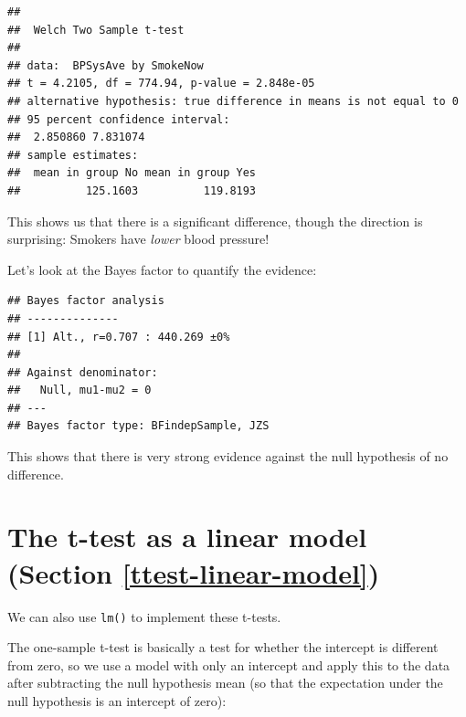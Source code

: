 \documentclass[12pt,]{book}
\newenvironment{Shaded}{\begin{snugshade}}{\end{snugshade}}
\newcommand{\DataTypeTok}[1]{\textcolor[rgb]{0.13,0.29,0.53}{#1}}
\newcommand{\KeywordTok}[1]{\textcolor[rgb]{0.13,0.29,0.53}{\textbf{#1}}}
\newcommand{\NormalTok}[1]{#1}
\newcommand{\OperatorTok}[1]{\textcolor[rgb]{0.81,0.36,0.00}{\textbf{#1}}}
\newcommand{\StringTok}[1]{\textcolor[rgb]{0.31,0.60,0.02}{#1}}
\begin{document}
\begin{verbatim}
## 
##  Welch Two Sample t-test
## 
## data:  BPSysAve by SmokeNow
## t = 4.2105, df = 774.94, p-value = 2.848e-05
## alternative hypothesis: true difference in means is not equal to 0
## 95 percent confidence interval:
##  2.850860 7.831074
## sample estimates:
##  mean in group No mean in group Yes 
##          125.1603          119.8193
\end{verbatim}

This shows us that there is a significant difference, though the direction is surprising: Smokers have \emph{lower} blood pressure!

Let's look at the Bayes factor to quantify the evidence:

\begin{Shaded}
\end{Shaded}

\begin{verbatim}
## Bayes factor analysis
## --------------
## [1] Alt., r=0.707 : 440.269 ±0%
## 
## Against denominator:
##   Null, mu1-mu2 = 0 
## ---
## Bayes factor type: BFindepSample, JZS
\end{verbatim}

This shows that there is very strong evidence against the null hypothesis of no difference.

\hypertarget{the-t-test-as-a-linear-model-section-refttest-linear-model}{%
\section{The t-test as a linear model (Section \ref{ttest-linear-model})}\label{the-t-test-as-a-linear-model-section-refttest-linear-model}}

We can also use \texttt{lm()} to implement these t-tests.

The one-sample t-test is basically a test for whether the intercept is different from zero, so we use a model with only an intercept and apply this to the data after subtracting the null hypothesis mean (so that the expectation under the null hypothesis is an intercept of zero):
\end{document}

